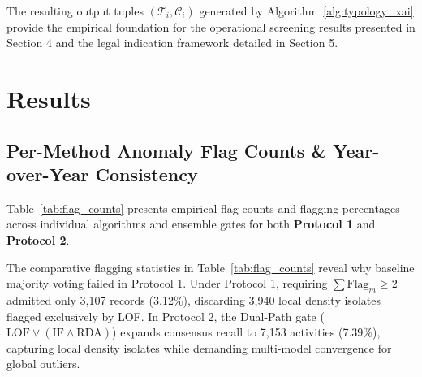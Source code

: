 \documentclass[runningheads]{llncs}
\begin{document}
The resulting output tuples $(\mathcal{T}_i, \mathcal{C}_i)$ generated by Algorithm~\ref{alg:typology_xai} provide the empirical foundation for the operational screening results presented in Section 4 and the legal indication framework detailed in Section 5.

\section{Results}

\subsection{Per-Method Anomaly Flag Counts \& Year-over-Year Consistency}
Table~\ref{tab:flag_counts} presents empirical flag counts and flagging percentages across individual algorithms and ensemble gates for both \textbf{Protocol 1} and \textbf{Protocol 2}.

\begin{table}[htbp]
\centering
\caption{Per-Method Anomaly Flag Counts and Overall Rates (\textbf{Protocol 1} vs \textbf{Protocol 2})}
\label{tab:flag_counts}
\end{table}

The comparative flagging statistics in Table~\ref{tab:flag_counts} reveal why baseline majority voting failed in Protocol 1. Under Protocol 1, requiring $\sum \text{Flag}_m \ge 2$ admitted only 3,107 records (3.12\%), discarding 3,940 local density isolates flagged exclusively by LOF. In Protocol 2, the Dual-Path gate ($\text{LOF} \lor (\text{IF} \land \text{RDA})$) expands consensus recall to 7,153 activities (7.39\%), capturing local density isolates while demanding multi-model convergence for global outliers.
\end{document}
